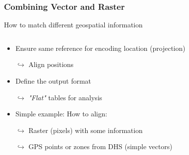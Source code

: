 \documentclass[xcolor=x11names,compress]{beamer}
\renewcommand{\(}{\begin{columns}}
\renewcommand{\)}{\end{columns}}
\newcommand{\<}[1]{\begin{column}{#1}}
\renewcommand{\>}{\end{column}}
\begin{document}
\begin{frame}
    \frametitle{Combining Vector and Raster }
How to match different geospatial information
    \begin{columns}[T]
        \begin{column}{0.6\textwidth}
            \begin{itemize}[<+->]
            \item Ensure same reference for encoding location (projection)
             \item[$\hookrightarrow$] Align positions
             \item Define the output format
             \item[$\hookrightarrow$] \emph{"Flat"} tables for analysis
             \item Simple example: How to align:
             \item[$\hookrightarrow$] Raster (pixels) with some information
             \item[$\hookrightarrow$] GPS points or zones from DHS (simple vectors)
             \item[]
            \end{itemize}
        \end{column}
        \begin{column}{0.4\textwidth}
        \begin{itemize}
             \item[]

\end{itemize}
\end{column}
\end{columns}
\end{frame}
\end{document}
